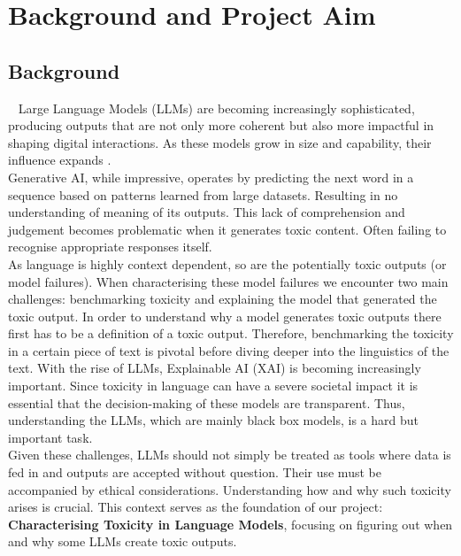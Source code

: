 \section{Background and Project Aim}
\subsection*{Background}
\
\noindent
Large Language Models (LLMs) are becoming increasingly sophisticated, producing outputs that are not only more coherent but also more impactful in shaping digital interactions. As these models grow in size and capability, their influence expands \cite{hao2022languagemodelsgeneralpurposeinterfaces}.
\\
Generative AI, while impressive, operates by predicting the next word in a sequence based on patterns learned from large datasets. Resulting in no understanding of meaning of its outputs. This lack of comprehension and judgement becomes problematic when it generates toxic content. Often failing to recognise appropriate responses itself.
\\
As language is highly context dependent, so are the potentially toxic outputs (or model failures). When characterising these model failures we encounter two main challenges: benchmarking toxicity and explaining the model that generated the toxic output. 
In order to understand why a model generates toxic outputs there first has to be a definition of a toxic output. Therefore, benchmarking the toxicity in a certain piece of text is pivotal before diving deeper into the linguistics of the text. With the rise of LLMs, Explainable AI (XAI) is becoming increasingly important. Since toxicity in language can have a severe societal impact it is essential that the decision-making of these models are transparent. Thus, understanding the LLMs, which are mainly black box models, is a hard but important task.
\\
Given these challenges, LLMs should not simply be treated as tools where data is fed in and outputs are accepted without question. Their use must be accompanied by ethical considerations. Understanding how and why such toxicity arises is crucial. This context serves as the foundation of our project: \textbf{Characterising Toxicity in Language Models}, focusing on figuring out when and why some LLMs create toxic outputs.

